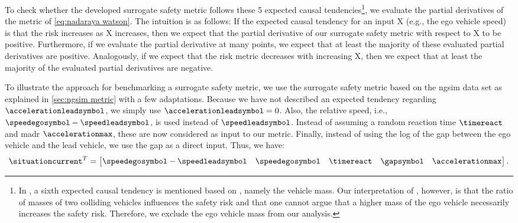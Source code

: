 To check whether the developed surrogate safety metric follows these 5 expected causal tendencies\footnote{In \autocite{mullakkal2017comparative}, a sixth expected causal tendency is mentioned based on \autocite{evans1994driver}, namely the vehicle mass. 
Our interpretation of \autocite{evans1994driver}, however, is that the ratio of masses of two colliding vehicles influences the safety risk and that one cannot argue that a higher mass of the ego vehicle necessarily increases the safety risk. 
Therefore, we exclude the ego vehicle mass from our analysis.}, we evaluate the partial derivatives of the metric of \cref{eq:nadaraya watson}.
The intuition is as follows: If the expected causal tendency for an input X (e.g., the ego vehicle speed) is that the risk increases as X increases, then we expect that the partial derivative of our surrogate safety metric with respect to X to be positive.
Furthermore, if we evaluate the partial derivative at many points, we expect that at least the majority of these evaluated partial derivatives are positive.
Analogously, if we expect that the risk metric decreases with increasing X, then we expect that at least the majority of the evaluated partial derivatives are negative.

To illustrate the approach for benchmarking a surrogate safety metric, we use the surrogate safety metric based on the \ac{ngsim} data set as explained in \cref{sec:ngsim metric} with a few adaptations.
Because we have not described an expected tendency regarding $\accelerationleadsymbol$, we simply use $\accelerationleadsymbol=0$.
Also, the relative speed, i.e., $\speedegosymbol-\speedleadsymbol$, is used instead of $\speedleadsymbol$.
Instead of assuming a random reaction time $\timereact$ and \ac{madr} $\accelerationmax$, these are now considered as input to our metric. 
Finally, instead of using the log of the gap between the ego vehicle and the lead vehicle, we use the gap as a direct input.
Thus, we have:
\begin{equation}
	\label{eq:input partial derivatives}
	\situationcurrent^T = \begin{bmatrix}
		\speedegosymbol-\speedleadsymbol & \speedegosymbol & \timereact & \gapsymbol & \accelerationmax
	\end{bmatrix}.
\end{equation}

